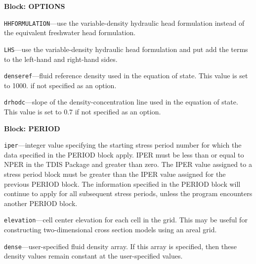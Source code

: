 
\item \textbf{Block: OPTIONS}

\begin{description}
\item \texttt{HHFORMULATION}---use the variable-density hydraulic head formulation instead of the equivalent freshwater head formulation.

\item \texttt{LHS}---use the variable-density hydraulic head formulation and put add the terms to the left-hand and right-hand sides.

\item \texttt{denseref}---fluid reference density used in the equation of state.  This value is set to 1000. if not specified as an option.

\item \texttt{drhodc}---slope of the density-concentration line used in the equation of state.  This value is set to 0.7 if not specified as an option.

\end{description}
\item \textbf{Block: PERIOD}

\begin{description}
\item \texttt{iper}---integer value specifying the starting stress period number for which the data specified in the PERIOD block apply.  IPER must be less than or equal to NPER in the TDIS Package and greater than zero.  The IPER value assigned to a stress period block must be greater than the IPER value assigned for the previous PERIOD block.  The information specified in the PERIOD block will continue to apply for all subsequent stress periods, unless the program encounters another PERIOD block.

\item \texttt{elevation}---cell center elevation for each cell in the grid.  This may be useful for constructing two-dimensional cross section models using an areal grid.

\item \texttt{dense}---user-specified fluid density array.  If this array is specified, then these density values remain constant at the user-specified values.

\end{description}

